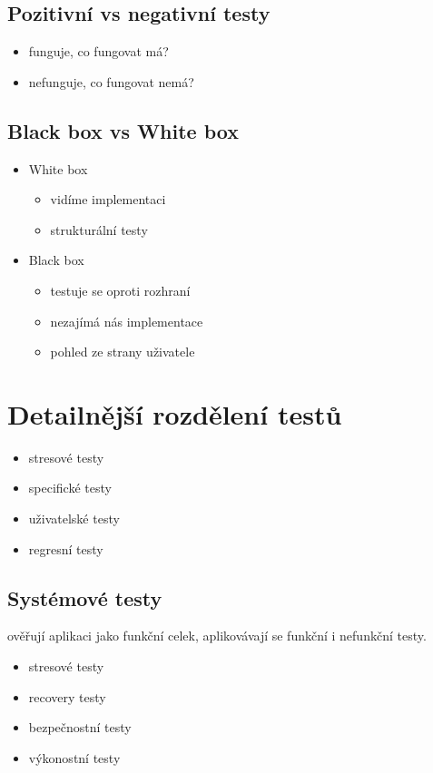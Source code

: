 \documentclass{szzclass}
\begin{document}
\subsection{Pozitivní vs negativní testy}
\begin{itemize}
    \item funguje, co fungovat má?
    \item nefunguje, co fungovat nemá?
\end{itemize}
\subsection{Black box vs White box}
\begin{itemize}
    \item White box
    \begin{itemize}
        \item vidíme implementaci
        \item strukturální testy
    \end{itemize}
    \item Black box
    \begin{itemize}
        \item testuje se oproti rozhraní
        \item nezajímá nás implementace
        \item pohled ze strany uživatele
    \end{itemize}
\end{itemize}
\section{Detailnější rozdělení testů}
\begin{itemize}
    \item stresové testy
    \item specifické testy
    \item uživatelské testy
    \item regresní testy
\end{itemize}
\subsection{Systémové testy}
ověřují aplikaci jako funkční celek, aplikovávají se funkční i nefunkční testy.
\begin{itemize}
    \item stresové testy
    \item recovery testy
    \item bezpečnostní testy
    \item výkonostní testy
\end{itemize}
\end{document}
